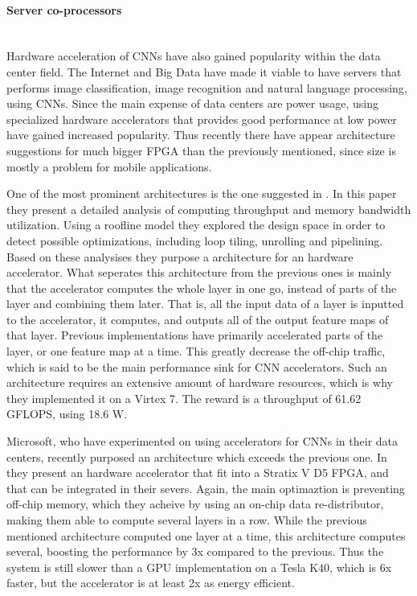 \paragraph{Server co-processors} \hfil \\
Hardware acceleration of CNNs have also gained popularity within the data center field. The Internet and Big Data have made it viable to have servers that performs image classification, image recognition and natural language processing, using CNNs. Since the main expense of data centers are power usage, using specialized hardware accelerators that provides good performance at low power have gained increased popularity. Thus recently there have appear architecture suggestions for much bigger FPGA than the previously mentioned, since size is mostly a problem for mobile applications. 

One of the most prominent architectures is the one suggested in \cite{Virtex_paper}. In this paper they present a detailed analysis of computing throughput and memory bandwidth utilization. Using a roofline model \cite{roofline_model} they explored the design space in order to detect possible optimizations, including loop tiling, unrolling and pipelining. Based on these analysises they purpose a architecture for an hardware accelerator. What seperates this architecture from the previous ones is mainly that the accelerator computes the whole layer in one go, instead of parts of the layer and combining them later. That is, all the input data of a layer is inputted to the accelerator, it computes, and outputs all of the output feature maps of that layer. Previous implementations have primarily accelerated parts of the layer, or one feature map at a time. This greatly decrease the off-chip traffic, which is said to be the main performance sink for CNN accelerators. Such an architecture requires an extensive amount of hardware resources, which is why they implemented it on a Virtex 7. The reward is a throughput of 61.62 GFLOPS, using 18.6 W.   

Microsoft, who have experimented on using accelerators for CNNs in their data centers, recently purposed an architecture which exceeds the previous one. In \cite{Microsoft_paper} they present an hardware accelerator that fit into a Stratix V D5 FPGA, and that can be integrated in their severs. Again, the main optimaztion is preventing off-chip memory, which they acheive by using an on-chip data re-distributor, making them able to compute several layers in a row. While the previous mentioned architecture computed one layer at a time, this architecture computes several, boosting the performance by 3x compared to the previous. Thus the system is still slower than a GPU implementation on a Tesla K40, which is 6x faster, but the accelerator is at least 2x as energy efficient.
 

